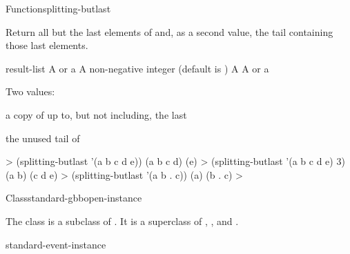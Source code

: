 \documentclass[10pt,twoside,english,pdftex]{article}
\begin{document}
\begin{functiondoc}{Function}{splitting-butlast}{
      
    }
%
%
  
\fnsyntax

\fnpurpose Return all but the last  elements of 
and, as a second value, the tail containing those last 
elements. 

\fnpackage {}

\fnmodule {}

\fnargs
\begin{args}{result-list}
\arg[list] A  or a 
\arg[n] A non-negative integer (default is )
 A 
\arg[tail] A  or a 
\end{args}

\fnreturns Two values:
\begin{tightitemize}
\item a copy of  up to, but not including, the last
   
\item the unused tail of 
\end{tightitemize}

\fnexamples
%
\W\supp
\begin{example}
  > (splitting-butlast '(a b c d e))
  (a b c d)
  (e)
  > (splitting-butlast '(a b c d e) 3)
  (a b)
  (c d e)\goodpagebreak
  > (splitting-butlast '(a b . c))
  (a)
  (b . c)
  >
\end{example}

\end{functiondoc}


\begin{functiondoc}{Class}{standard-gbbopen-instance}{}
%
  
\fnsyntax

\fnpackage {}

\fnmodule {}

\fndescription The class  is a
subclass of .  It is a superclass of
,
, and
.

\begin{alsos}{standard-event-instance}
\end{alsos}

\end{functiondoc}
\end{document}

